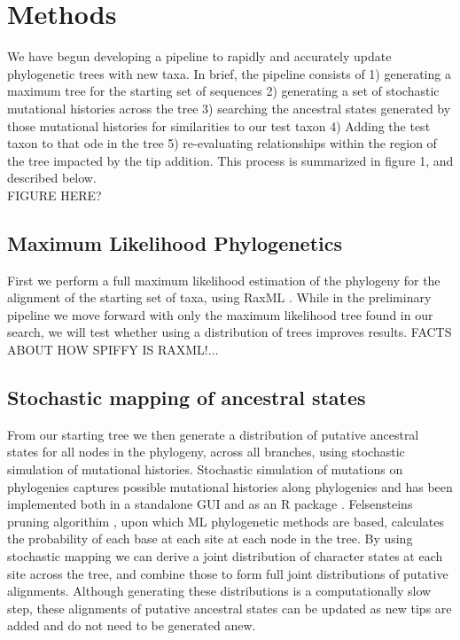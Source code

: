 \documentclass[10pt]{article}
\begin{document}
\section*{Methods}

We have begun developing a pipeline to rapidly and accurately update phylogenetic trees with new taxa. In brief, the pipeline consists of 1) generating a maximum tree for the starting set of sequences 2) generating a set of stochastic mutational histories across the tree 3) searching the ancestral states generated by those mutational histories for similarities to our test taxon 4) Adding the test taxon to that ode in the tree 5) re-evaluating relationships within the region of the tree impacted by the tip addition. This process is summarized in figure 1, and described below.
\\     FIGURE HERE?

\subsection{Maximum Likelihood Phylogenetics}
First we perform a full maximum likelihood estimation of the phylogeny for the alignment of the starting set of taxa, using RaxML \cite{stamatakis_RAxML-VI-HPC:_2006}. While in the preliminary pipeline we move forward with only the maximum likelihood tree found in our search, we will test whether using a distribution of trees improves results. FACTS ABOUT HOW SPIFFY IS RAXML!...

\subsection{Stochastic mapping of ancestral states}
From our starting tree we then generate a distribution of putative ancestral states for all nodes in the phylogeny, across all branches, using stochastic simulation of mutational histories. Stochastic simulation of mutations on phylogenies captures possible mutational histories along phylogenies \cite{nielsen_mapping_2002, huelsenbeck_stochastic_2003} and has been implemented both in a standalone GUI \cite{bollback_simmap_2006} and as an R package \cite{revell_phytools_2012}. Felsensteins pruning algorithim \cite{felsenstein_evolutionary_19}, upon which ML phylogenetic methods are based, calculates the probability of each base at each site at each node in the tree. By using stochastic mapping we can derive a joint distribution of character states at each site across the tree, and combine those to form full joint distributions of putative alignments. Although generating these distributions is a computationally slow step, these alignments of putative ancestral states can be updated as new tips are added and do not need to be generated anew. 
\end{document}
